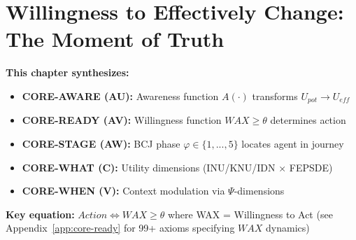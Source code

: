 
\chapter{Willingness to Effectively Change: The Moment of Truth}
\label{ch:wec}


\begin{tcolorbox}[colback=purple!5!white, colframe=purple!75!black,
    title=\textbf{9C CORE Framework Integration}]
\textbf{This chapter synthesizes:}
\begin{itemize}[nosep]
    \item \textbf{CORE-AWARE (AU):} Awareness function $A(\cdot)$ transforms $U_{pot} \to U_{eff}$
    \item \textbf{CORE-READY (AV):} Willingness function $WAX \geq \theta$ determines action
    \item \textbf{CORE-STAGE (AW):} BCJ phase $\varphi \in \{1,...,5\}$ locates agent in journey
    \item \textbf{CORE-WHAT (C):} Utility dimensions (INU/KNU/IDN × FEPSDE)
    \item \textbf{CORE-WHEN (V):} Context modulation via $\Psi$-dimensions
\end{itemize}

\textbf{Key equation:} $Action \Leftrightarrow WAX \geq \theta$ where WAX = Willingness to Act
(see Appendix~\ref{app:core-ready} for 99+ axioms specifying $WAX$ dynamics)
\end{tcolorbox}

